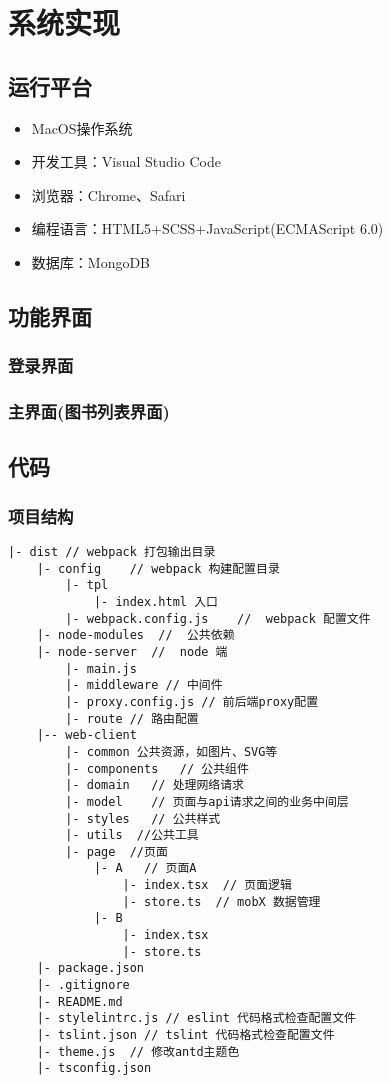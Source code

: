 
\chapter{系统实现}%
\section{运行平台}
\begin{itemize}
    \item MacOS操作系统
    \item 开发工具：Visual Studio Code
    \item 浏览器：Chrome、Safari
    \item 编程语言：HTML5+SCSS+JavaScript(ECMAScript 6.0)
    \item 数据库：MongoDB
\end{itemize}
\section{功能界面}
\subsection{登录界面}
\subsection{主界面(图书列表界面)}
\section{代码}
\subsection{项目结构}
\begin{lstlisting}[numberstyle=\tiny,keywordstyle=\color{blue!70},
    commentstyle=\color{red!50!green!50!blue!50},frame=shadowbox,
    rulesepcolor=\color{red!20!green!20!blue!20},basicstyle=\ttfamily]
    |- dist // webpack 打包输出目录
    |- config    // webpack 构建配置目录  
    ​    |- tpl  
    ​        |- index.html 入口  
    ​    |- webpack.config.js    //  webpack 配置文件  
    |- node-modules  //  公共依赖  
    |- node-server  //  node 端  
    ​    |- main.js  
    ​    |- middleware // 中间件  
    ​    |- proxy.config.js // 前后端proxy配置   
    ​    |- route // 路由配置  
    |-- web-client 
    ​    |- common 公共资源，如图片、SVG等  
    ​    |- components   // 公共组件  
    ​    |- domain   // 处理网络请求   
    ​    |- model    // 页面与api请求之间的业务中间层  
    ​    |- styles   // 公共样式  
    ​    |- utils  //公共工具  
    ​    |- page  //页面 
    ​        |- A   // 页面A 
    ​            |- index.tsx  // 页面逻辑  
    ​            |- store.ts  // mobX 数据管理   
    ​        |- B  
    ​            |- index.tsx  
    ​            |- store.ts  
    |- package.json   
    |- .gitignore  
    |- README.md   
    |- stylelintrc.js // eslint 代码格式检查配置文件  
    |- tslint.json // tslint 代码格式检查配置文件   
    |- theme.js  // 修改antd主题色   
    |- tsconfig.json    
\end{lstlisting}
